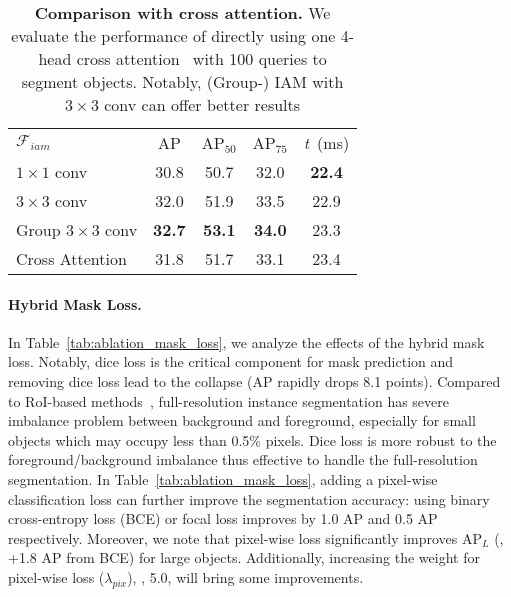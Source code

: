 \documentclass[10pt,twocolumn,letterpaper]{article}
\newcommand{\tb}[1]{\textbf{#1}}
\newcommand{\aps}{AP & AP$_{50}$ & AP$_{75}$}
\newcommand{\tline}{\Xhline{1pt}}
\begin{document}
\begin{table*}
\begin{minipage}[t]{0.310\linewidth}
{\begin{tabular}{l|ccc|c}
$\mathcal{F}_{iam}$ & \aps & \textit{t}~(ms)\\
    \tline
    $1\!\times\!1$ conv & 30.8 & 50.7 & 32.0 & \tb{22.4} \\
    $3\!\times\!3$ conv & 32.0 & 51.9 & 33.5 & 22.9 \\
    Group $3\!\times\!3$ conv & \tb{32.7} & \tb{53.1} & \tb{34.0} & 23.3 \\
    \hline
    Cross Attention & 31.8 & 51.7 & 33.1 & 23.4 \\
\end{tabular}}
    \caption{\textbf{Comparison with cross attention.} 
    We evaluate the performance of directly using one 4-head cross attention~\cite{DETRCarionMSUKZ20} with 100 queries to segment objects. Notably, (Group-) IAM with $3\!\times\!3$ conv can offer better results}
    \label{tab:ablation_cross_attention}
\end{minipage}
\vspace{-8pt}
\end{table*}

\paragraph{Hybrid Mask Loss.}
In Table~\ref{tab:ablation_mask_loss}, we analyze the effects of the hybrid mask loss.
Notably, dice loss is the critical component for mask prediction and removing dice loss lead to the collapse (AP rapidly drops 8.1 points).
Compared to RoI-based methods~\cite{MaskRCNNHeGDG17}, full-resolution instance segmentation has severe imbalance problem between background and foreground, especially for small objects which may occupy less than 0.5\% pixels.
Dice loss is more robust to the foreground/background imbalance thus effective to handle the full-resolution segmentation.
In Table~\ref{tab:ablation_mask_loss}, adding a pixel-wise classification loss can further improve the segmentation accuracy: using binary cross-entropy loss (BCE) or focal loss improves by 1.0 AP and 0.5 AP respectively. 
Moreover, we note that pixel-wise loss significantly improves AP$_L$ (\eg, +1.8 AP from BCE) for large objects.
Additionally, increasing the weight for pixel-wise loss ($\lambda_{pix}$), \eg, 5.0, will bring some improvements.
\end{document}
